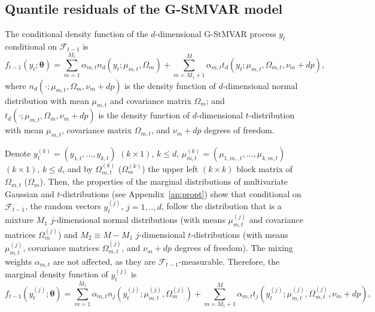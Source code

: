 \documentclass[nojss]{jss}
\begin{document}
\begin{appendix}
\section{Quantile residuals of the G-StMVAR model}\label{ap:qresexpr}
The conditional density function of the $d$-dimensional G-StMVAR process $y_t$ conditional on  $\mathcal{F}_{t-1}$ is
\begin{equation}\label{eq:gstmvarconddens}
f_{t-1}(y_t;\boldsymbol{\theta})=\sum_{m=1}^{M_1}\alpha_{m,t}n_d(y_t;\mu_{m,t},\Omega_{m}) + \sum_{m=M_1+1}^{M}\alpha_{m,t}t_d(y_t;\mu_{m,t},\Omega_{m,t},\nu_m + dp),
\end{equation}
where $n_d(\cdot;\mu_{m,t},\Omega_m,\nu_m + dp)$ is the density function of $d$-dimensional normal distribution with mean $\mu_{m,t}$ and covariance matrix $\Omega_{m}$; and  $t_d(\cdot;\mu_{m,t},\Omega_m,\nu_m + dp)$ is the density function of $d$-dimensional $t$-distribution with mean $\mu_{m,t}$, covariance matrix $\Omega_{m,t}$,  and $\nu_m + dp$ degrees of freedom.

Denote $y_t^{(k)}=(y_{1,t},...,y_{k,t})$ $(k\times 1)$,  $k\leq d$,   $\mu_{m,t}^{(k)}=(\mu_{1,m,,t},...,\mu_{k,m,t})$ $(k\times 1)$,  $k\leq d$,  and by $\Omega_{m,t}^{(k)}$ ($\Omega_{m}^{(k)}$) the upper left $(k\times k)$ block matrix of $\Omega_{m,t}$ ($\Omega_{m}$).  Then,  the properties of the marginal distributions of multivariate Gaussian and $t$-distributions (see Appendix~\ref{ap:propt}) show that conditional on $\mathcal{F}_{t-1}$,  the random vectors $y_t^{(j)}$, $j=1,..,d$,  follow the distribution that is a mixture $M_1$ $j$-dimensional normal distributions (with means $\mu_{m,t}^{(j)}$ and covariance matrices $\Omega_{m}^{(j)}$) and $M_2\equiv M-M_1$ $j$-dimensional $t$-distributions (with means $\mu_{m,t}^{(j)}$,  covariance matrices $\Omega_{m,t}^{(j)}$, and $\nu_m + dp$ degrees of freedom).  The mixing weights $\alpha_{m,t}$ are not affected, as they are $\mathcal{F}_{t-1}$-measurable.  Therefore, the marginal density function of $y_t^{(j)}$ is
\begin{equation}\label{eq:ytj_margdens}
f_{t-1}(y_{t}^{(j)};\boldsymbol{\theta})=\sum_{m=1}^{M_1}\alpha_{m,t} n_j(y_{t}^{(j)};\mu_{m,t}^{(j)},\Omega_{m}^{(j)}) + \sum_{m=M_1 + 1}^{M}\alpha_{m,t} t_j(y_{t}^{(j)};\mu_{m,t}^{(j)},\Omega_{m,t}^{(j)},\nu_m + dp),
\end{equation}


\end{appendix}
\end{document}
